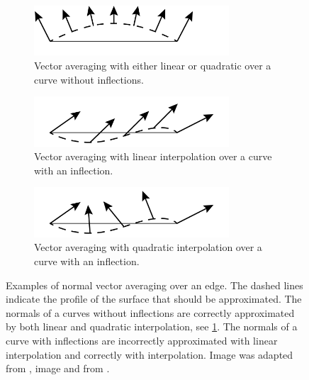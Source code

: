 	\begin{figure}
		\centering
		\begin{subfigure}{\columnwidth}
			\centering
			\includegraphics[width=0.8\textwidth]{./content/img/method/linearVsQuadraticNormals_both.png}
			\caption{Vector averaging with either linear or quadratic over a curve without inflections.}
			\label{fig:method:normal:both}
		\end{subfigure}
		\begin{subfigure}{\columnwidth}
			\centering
			\includegraphics[width=0.8\textwidth]{./content/img/method/linearVsQuadraticNormals_linear}
			\caption{Vector averaging with linear interpolation over a curve with an inflection.}
			\label{fig:method:normal:linear}
		\end{subfigure}	
		\begin{subfigure}{\columnwidth}
			\centering
			\includegraphics[width=0.8\textwidth]{./content/img/method/linearVsQuadraticNormals_quadratic}
			\caption{Vector averaging with quadratic interpolation over a curve with an inflection.}
			\label{fig:method:normal:quadratic}
		\end{subfigure}			
		\caption{Examples of normal vector averaging over an edge. The dashed lines indicate the profile of the surface that should be approximated. The normals of a curves without inflections are correctly approximated by both linear and quadratic interpolation, see \cref{fig:method:normal:both}. The normals of a curve with inflections are incorrectly approximated with  linear interpolation and correctly with  interpolation. Image  was adapted from \cite{van1997phong}, image  and  from \cite{vlachos2001curved}.}
		\label{fig:method:linear_vs_quadratically_varying}
	\end{figure}

